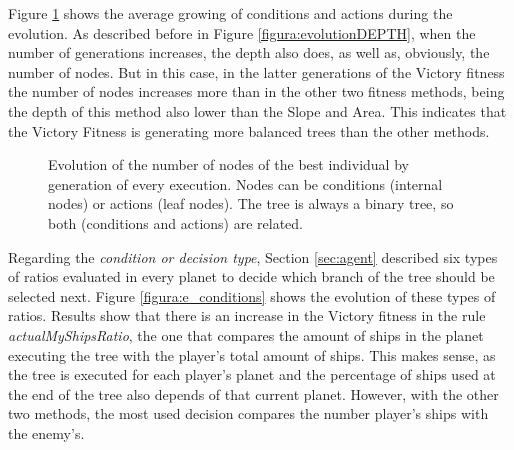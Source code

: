 \documentclass[preprint]{elsarticle}
\begin{document}
Figure \ref{figura:e_number_nodes} shows the average growing of
conditions and actions during the evolution. As described before in
Figure \ref{figura:evolutionDEPTH}, when the number of generations
increases, the depth also does, as well as, obviously, the number of
nodes. But in this case, in the latter generations of the Victory
fitness the number of nodes increases more than in the other two
fitness methods, being the depth of this method also lower than the
Slope and Area. This indicates that the Victory Fitness is generating
more balanced trees than the other methods. 

  \begin{figure}[ht]
  \begin{center}
  \end{center}
  \caption{Evolution of the number of nodes of the best individual by generation of every execution. Nodes can be conditions (internal nodes) or actions (leaf nodes). The tree is always a binary tree, so both (conditions and actions) are related.}
  \label{figura:e_number_nodes}
  \end{figure}

Regarding the {\em condition or decision type}, Section
\ref{sec:agent} described six types of ratios evaluated in every
planet to decide which  branch of the tree should be
selected next. Figure \ref{figura:e_conditions} shows the evolution of
these types of ratios. Results show that there is an increase in the
Victory fitness in the rule \emph{actualMyShipsRatio}, the one that
compares the amount of ships in the planet executing the tree with the
player's total amount of ships. This makes sense, as the tree is
executed for each player's planet and the percentage of ships used at
the end of the tree also depends of that current planet. However, with
the other two methods, the most used decision compares the number
player's ships with the enemy's.  
\end{document}
